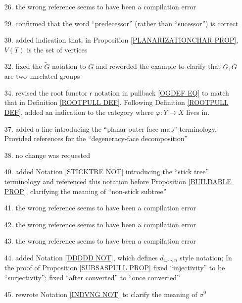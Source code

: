 \documentclass{article}
\begin{document}
\begin{itemize}
\item[26.] the wrong reference seems to have been a compilation error

\item[29.] confirmed that the word ``predecessor'' (rather than ``sucessor'') is correct

\item[30.] added indication that, 
in Proposition \ref{PLANARIZATIONCHAR PROP},
$V(T)$ is the set of vertices

\item[32.] fixed the $\tilde{G}$ notation to $\bar{G}$ and reworded the example to clarify that $G,\bar{G}$ are two unrelated groups

\item[34.] revised the root functor $\mathsf{r}$ notation in pullback \eqref{OGDEF EQ} 
to match that in Definition \ref{ROOTPULL DEF}.
Following Definition \ref{ROOTPULL DEF},
added an indication to the category where 
$\varphi \colon Y \to X$ lives in.

\item[37.] added a line introducing the ``planar outer face map'' terminology. Provided references for the ``degeneracy-face decomposition'' 

\item[38.] no change was requested

\item[40.] added Notation \ref{STICKTRE NOT} introducing the ``stick tree'' terminology and referenced this notation before
Proposition \ref{BUILDABLE PROP},
clarifying the meaning of ``non-stick subtree''

\item[41.] the wrong reference seems to have been a compilation error

\item[42.] the wrong reference seems to have been a compilation error

\item[43.] the wrong reference seems to have been a compilation error

\item[44.] added Notation \ref{DDDDD NOT}, 
which defines $d_{1,\cdots,n}$ style notation; 
In the proof of Proposition \ref{SUBSASPULL PROP}
fixed ``injectivity'' to be ``surjectivity''; fixed ``after converted'' to ``once converted''

\item[45.] rewrote Notation \ref{INDVNG NOT}
to clarify the meaning of $\sigma^0$ 


\end{itemize}
\end{document}
